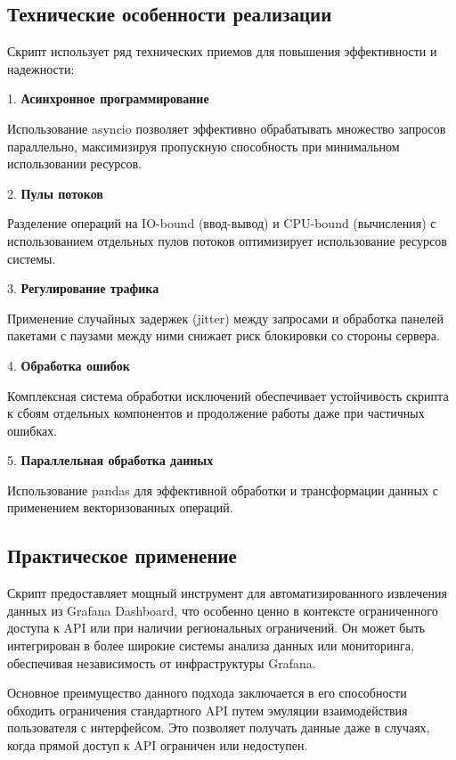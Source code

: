 \subsection{Технические особенности реализации}

Скрипт использует ряд технических приемов для повышения эффективности и
надежности:

1. \textbf{Асинхронное программирование}

Использование asyncio позволяет эффективно обрабатывать множество запросов
параллельно, максимизируя пропускную способность при минимальном
использовании ресурсов.

2. \textbf{Пулы потоков}

Разделение операций на IO-bound (ввод-вывод) и CPU-bound (вычисления) с
использованием отдельных пулов потоков оптимизирует использование ресурсов
системы.

3. \textbf{Регулирование трафика}

Применение случайных задержек (jitter) между запросами и обработка панелей
пакетами с паузами между ними снижает риск блокировки со стороны сервера.

4. \textbf{Обработка ошибок}

Комплексная система обработки исключений обеспечивает устойчивость скрипта к
сбоям отдельных компонентов и продолжение работы даже при частичных ошибках.

5. \textbf{Параллельная обработка данных}

Использование pandas для эффективной обработки и трансформации данных с
применением векторизованных операций.

\subsection{Практическое применение}

Скрипт предоставляет мощный инструмент для автоматизированного извлечения
данных из Grafana Dashboard, что особенно ценно в контексте ограниченного
доступа к API или при наличии региональных ограничений. Он может быть
интегрирован в более широкие системы анализа данных или мониторинга,
обеспечивая независимость от инфраструктуры Grafana.

Основное преимущество данного подхода заключается в его способности обходить
ограничения стандартного API путем эмуляции взаимодействия пользователя с
интерфейсом. Это позволяет получать данные даже в случаях, когда прямой
доступ к API ограничен или недоступен.

